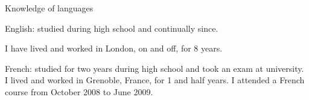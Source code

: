 \begin{rubric}{Knowledge of languages}

\entry*[16 years]
English: studied during high school and continually since.


I have lived and worked in London, on and off, for 8 years.

\entry*[3 years]
French: studied for two years during high school and took an exam
at university.
I lived and worked in Grenoble, France, for 1 and half years.
I attended a French course from October 2008 to June 2009.

\end{rubric}

